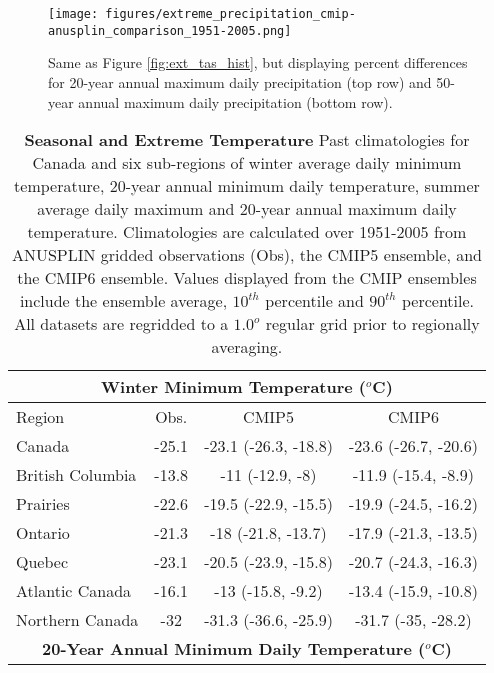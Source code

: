 \documentclass[]{scrartcl}
\begin{document}
\begin{figure}[ht!]
	\centering
	\texttt{[image: figures/extreme\_precipitation\_cmip-anusplin\_comparison\_1951-2005.png]}
	\caption[Pr]{Same as Figure \ref{fig:ext_tas_hist}, but displaying percent differences for 20-year annual maximum daily precipitation (top row) and 50-year annual maximum daily precipitation (bottom row).}
	\label{fig:ext_pr_hist}
\end{figure}


\begin{table}[t]
	\caption{\textbf{Seasonal and Extreme Temperature} Past climatologies for Canada and six sub-regions of winter average daily minimum temperature, 20-year annual minimum daily temperature, summer average daily maximum and 20-year annual maximum daily temperature. Climatologies are calculated over 1951-2005 from ANUSPLIN gridded observations (Obs), the CMIP5 ensemble, and the CMIP6 ensemble. Values displayed from the CMIP ensembles include the ensemble average, $10^{th}$ percentile and $90^{th}$ percentile. All datasets are regridded to a $1.0^o$ regular grid prior to regionally averaging.}\label{table:past_tas_compare}
	\begin{center}
		\begin{tabular}{|l|ccc|} 
			\hline
			\multicolumn{4}{|c|}{\textbf{Winter Minimum Temperature ($^o$C)}} \\
			\hline
			Region & Obs. & CMIP5 & CMIP6   \\
			\hline
			Canada & -25.1 & -23.1 (-26.3, -18.8) & -23.6 (-26.7, -20.6) \\ 
			British Columbia & -13.8 & -11 (-12.9, -8) & -11.9 (-15.4, -8.9) \\ 
			Prairies & -22.6 & -19.5 (-22.9, -15.5) & -19.9 (-24.5, -16.2) \\ 
			Ontario & -21.3 & -18 (-21.8, -13.7) & -17.9 (-21.3, -13.5) \\ 
			Quebec & -23.1 & -20.5 (-23.9, -15.8) & -20.7 (-24.3, -16.3) \\ 
			Atlantic Canada & -16.1 & -13 (-15.8, -9.2) & -13.4 (-15.9, -10.8) \\ 
			Northern Canada & -32 & -31.3 (-36.6, -25.9) & -31.7 (-35, -28.2) \\ 
			\hline	
			\multicolumn{4}{|c|}{\textbf{20-Year Annual Minimum Daily Temperature ($^o$C)}} \\

\end{tabular}
\end{center}
\end{table}
\end{document}
